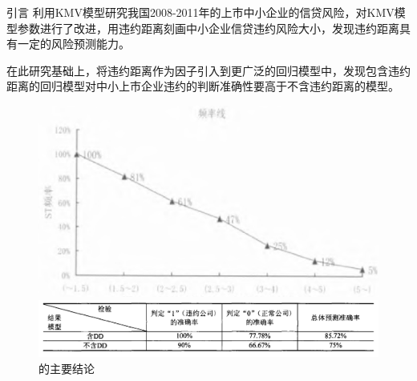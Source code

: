 \documentclass{ctexbeamer}
\begin{document}
\begin{frame}{引言}
    \citet{彭伟2012基于}利用KMV模型研究我国2008-2011年的上市中小企业的信贷风险，对KMV模型参数进行了改进，用违约距离刻画中小企业信贷违约风险大小，发现违约距离具有一定的风险预测能力。

    在此研究基础上，\citet{彭伟2012我国上市中小企业信贷风险研究}将违约距离作为因子引入到更广泛的回归模型中，发现包含违约距离的回归模型对中小上市企业违约的判断准确性要高于不含违约距离的模型。
    \begin{figure}
        \begin{minipage}{0.48\linewidth}
            \includegraphics[width=\linewidth]{fig/1art.jpeg}
        \end{minipage}
        \begin{minipage}{0.48\linewidth}
            \includegraphics[width=\linewidth]{fig/2art.jpeg}
        \end{minipage}
        \caption{\citeauthor{彭伟2012基于}的主要结论}
    \end{figure}
\end{frame}
\end{document}
